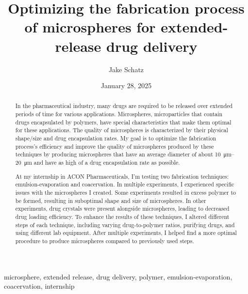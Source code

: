 ﻿\documentclass[12pt,conference,onecolumn]{IEEEtran}
\title{Optimizing the fabrication process of microspheres for extended-release drug delivery}
\author{Jake Schatz}
\date{January 28, 2025}
\newcommand{\keywords}{microsphere, extended release, drug delivery, polymer, emulsion-evaporation, coacervation, internship}
\begin{document}
\maketitle 

\begin{abstract}
In the pharmaceutical industry, many drugs are required to be released over extended periods of time for various applications. Microspheres, microparticles that contain drugs encapsulated by polymers, have special characteristics that make them optimal for these applications. The quality of microspheres is characterized by their physical shape/size and drug encapsulation rates. My goal is to optimize the fabrication process's efficiency and improve the quality of microspheres produced by these techniques by producing microspheres that have an average diameter of about \qtyrange{10}{20}{\micro\meter} and have as high of a drug encapsulation rate as possible.

At my internship in ACON Pharmaceuticals, I’m testing two fabrication techniques: emulsion-evaporation and coacervation. In multiple experiments, I experienced specific issues with the microspheres I created. Some experiments resulted in excess polymer to be formed, resulting in suboptimal shape and size of microspheres. In other experiments, drug crystals were present alongside microspheres, leading to decreased drug loading efficiency. To enhance the results of these techniques, I altered different steps of each technique, including varying drug-to-polymer ratios, purifying drugs, and using different lab equipment. After multiple experiments, I helped find a more optimal procedure to produce microspheres compared to previously used steps.
\end{abstract}

\begin{IEEEkeywords}
\keywords
\end{IEEEkeywords}
\end{document}
